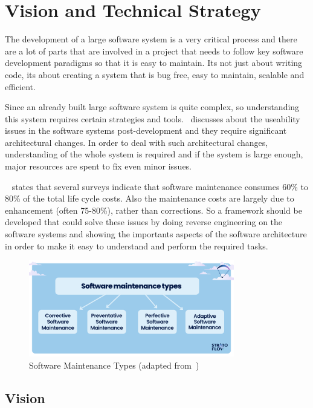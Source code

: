 \chapter{Vision and Technical Strategy}

The development of a large software system is a very critical process and there are a lot of parts that are involved in a project that needs to follow key software development paradigms so that it is easy to maintain. Its not just about writing code, its about creating a system that is bug free, easy to maintain, scalable and efficient.

Since an already built large software system is quite complex, so understanding this system requires certain strategies and tools.~\citep{Folmer2005} discusses about the useability issues in the software systems post-development and they require significant architectural changes. In order to deal with such architectural changes, understanding of the whole system is required and if the system is large enough, major resources are spent to fix even minor issues. 

~\citep{SeMaintainance2001} states that several surveys indicate that software maintenance consumes 60\% to 80\% of the total life cycle costs. Also the maintenance costs are largely due to enhancement (often 75{-}80\%), rather than corrections. So a framework should be developed that could solve these issues by doing reverse engineering on the software systems and showing the importants aspects of the software architecture in order to make it easy to understand and perform the required tasks.

\begin{figure}[ht]
    \centering
    \includegraphics[width=0.8\textwidth]{figures/se_maintenance.png}
    \caption[Software Maintenance Types]{Software Maintenance Types (adapted from~\cite{stratoflow2025})}
	\label{fig_se_maintenance}
\end{figure}

\section{Vision}

